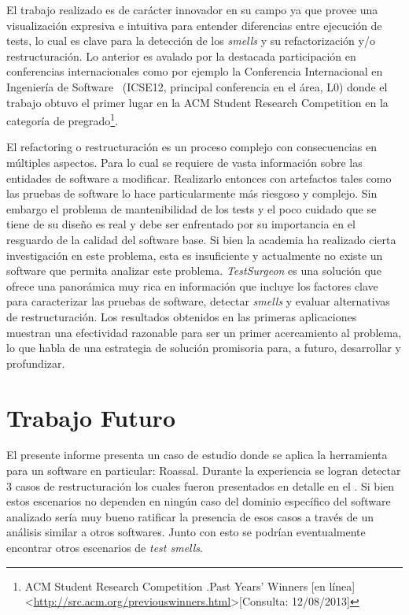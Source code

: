 \par El trabajo realizado es de carácter innovador en su campo ya que provee una visualización expresiva e intuitiva para entender diferencias entre ejecución de tests, lo cual es clave para la detección de los \emph{smells} y su refactorización y/o restructuración. Lo anterior es avalado por la destacada participación en conferencias internacionales como por ejemplo la Conferencia Internacional en Ingeniería de Software~\cite{Este12a} (ICSE12, principal conferencia en el área, L0) donde el trabajo obtuvo el primer lugar en la ACM Student Research Competition  en la categoría de pregrado\footnote{ACM Student Research Competition .Past Years' Winners [en línea] \textless\url{http://src.acm.org/previouswinners.html}\textgreater [Consulta: 12/08/2013]}.  

\par El refactoring o restructuración es un proceso complejo con consecuencias en múltiples aspectos. Para lo cual se requiere de vasta información sobre las entidades de software a modificar. Realizarlo entonces con artefactos tales como las pruebas de software lo hace particularmente más riesgoso y complejo. Sin embargo el problema de mantenibilidad de los tests y el poco cuidado que se tiene de su diseño es real y debe ser enfrentado por su importancia en el resguardo de la calidad del software base. Si bien la academia ha realizado cierta investigación en este problema, esta es insuficiente y actualmente no existe un software que permita analizar este problema. \emph{TestSurgeon} es una solución que ofrece una panorámica muy rica en información que incluye los factores clave para caracterizar las pruebas de software, detectar \emph{smells} y evaluar alternativas de restructuración. Los resultados obtenidos en las primeras aplicaciones muestran una efectividad razonable para ser un primer acercamiento al problema, lo que habla de una estrategia de solución promisoria para, a futuro, desarrollar y profundizar. 



\section{Trabajo Futuro}

\par El presente informe presenta un caso de estudio donde se aplica la herramienta para un software en particular: Roassal. Durante la experiencia se logran detectar 3 casos de restructuración los cuales fueron presentados en detalle en el . Si bien estos escenarios no dependen en ningún caso del dominio específico del software analizado sería muy bueno ratificar la presencia de esos casos a través de un análisis similar a otros softwares. Junto con esto se podrían eventualmente encontrar otros escenarios de \emph{test smells}.

